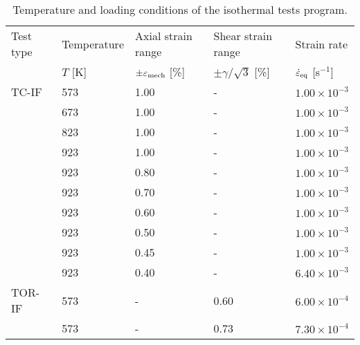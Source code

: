
\begin{table}[htbp]
  \centering
  \caption{Temperature and loading conditions of the isothermal tests program.}
    \begin{tabular}{p{2cm}p{2cm}p{3cm}p{3cm}p{2cm}}
    \toprule
    Test type & Temperature & Axial strain range & Shear strain range & Strain rate \\
          & $T$ [K] & $\pm \varepsilon _{\rm mech}$ [\%] & $\pm \gamma/ \sqrt 3$ [\%] & $\dot \varepsilon_{\rm{eq}}$ [s$^{-1}$] \\
    \midrule
    TC-IF    & 573   & 1.00  & -     & $1.00\times 10^{-3}$ \\
          & 673   & 1.00  & -     & $1.00\times 10^{-3}$ \\
          & 823   & 1.00  & -     & $1.00\times 10^{-3}$ \\
          & 923   & 1.00  & -     & $1.00\times 10^{-3}$ \\
          & 923   & 0.80  & -     & $1.00\times 10^{-3}$ \\
          & 923   & 0.70  & -     & $1.00\times 10^{-3}$ \\
          & 923   & 0.60  & -     & $1.00\times 10^{-3}$ \\
          & 923   & 0.50  & -     & $1.00\times 10^{-3}$ \\
          & 923   & 0.45  & -     & $1.00\times 10^{-3}$ \\
          & 923   & 0.40  & -     & $6.40\times 10^{-3}$ \\
    \midrule
    TOR-IF   & 573   & -     & 0.60  & $6.00\times 10^{-4}$ \\
          & 573   & -     & 0.73  & $7.30\times 10^{-4}$ \\

\end{tabular}
\end{table}
